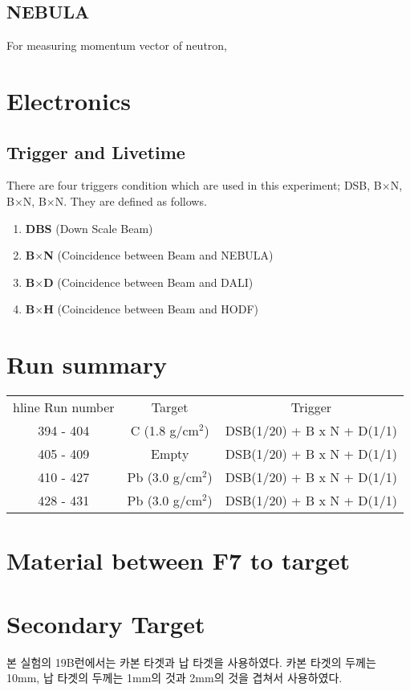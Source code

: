 \subsection{NEBULA}
For measuring momentum vector of neutron, 

\section{Electronics}
\subsection{Trigger and Livetime}
There are four triggers condition which are used in this experiment; DSB, B$\times$N, B$\times$N, B$\times$N. They are defined as follows.
\begin{enumerate}
    \item \textbf{DBS} (Down Scale Beam) 
    \item \textbf{B$\times$N} (Coincidence between Beam and NEBULA)
    \item \textbf{B$\times$D} (Coincidence between Beam and DALI)
    \item \textbf{B$\times$H} (Coincidence between Beam and HODF)
\end{enumerate} 
\subsection{}
\section{Run summary}
\begin{center}
    \begin{tabular}[h]{ccc}
         hline
        Run number& Target & Trigger \\
        394 - 404 &  C (1.8 g/cm${}^{2}$)  & DSB(1/20) + B x N + D(1/1)\\
        405 - 409 &  Empty  & DSB(1/20) + B x N + D(1/1)\\
        410 - 427 &  Pb (3.0 g/cm${}^{2}$)  & DSB(1/20) + B x N + D(1/1)\\
        428 - 431 & Pb (3.0 g/cm${}^{2}$)  & DSB(1/20) + B x N + D(1/1)\\
    \end{tabular}
\end{center}

\section{Material between F7 to target}
\section{Secondary Target}
본 실험의 19B런에서는 카본 타겟과 납 타겟을 사용하였다. 카본 타겟의 두께는 10mm, 납 타겟의 두께는 1mm의 것과 2mm의 것을 겹쳐서 사용하였다. 